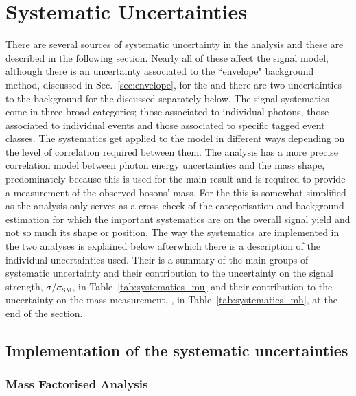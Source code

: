 \section{Systematic Uncertainties}
\label{sec:systematics}

There are several sources of systematic uncertainty in the analysis and these are described in the following section. Nearly all of these affect the signal model, although there is an uncertainty associated to the ``envelope" background method, discussed in Sec.~\ref{sec:envelope}, for the \MFM and there are two uncertainties to the background for the \SMVA discussed separately below. The signal systematics come in three broad categories; those associated to individual photons, those associated to individual events and those associated to specific tagged event classes. The systematics get applied to the model in different ways depending on the level of correlation required between them. The \MFM analysis has a more precise correlation model between photon energy uncertainties and the mass shape, predominately because this is used for the main result and is required to provide a measurement of the observed bosons' mass. For the \SMVA this is somewhat simplified as the analysis only serves as a cross check of the categorisation and background estimation for which the important systematics are on the overall signal yield and not so much its shape or position. The way the systematics are implemented in the two analyses is explained below afterwhich there is a description of the individual uncertainties used. Their is a summary of the main groups of systematic uncertainty and their contribution to the uncertainty on the signal strength, $\sigma/\sigma_{\mathrm{SM}}$, in Table~\ref{tab:systematics_mu} and their contribution to the uncertainty on the mass measurement, \mH, in Table~\ref{tab:systematics_mh}, at the end of the section.

\subsection{Implementation of the systematic uncertainties}

\subsubsection{Mass Factorised Analysis}

